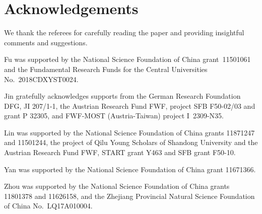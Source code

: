 \documentclass[12pt]{amsart}
\theoremstyle{plain}
\theoremstyle{definition}
\theoremstyle{example}
\theoremstyle{remark}
\numberwithin{equation}{section}
\numberwithin{figure}{section}
\begin{document}
\section*{Acknowledgements}

We thank the referees for carefully reading the paper and providing insightful comments and suggestions. 


Fu was supported by the National Science Foundation of China  grant~11501061 and the Fundamental Research Funds for the Central Universities No.~2018CDXYST0024.


Jin gratefully acknowledges supports from the German Research Foundation DFG, JI 207/1-1, the Austrian Research Fund FWF, project SFB F50-02/03 and grant P 32305, and FWF-MOST (Austria-Taiwan) project I~2309-N35.


Lin was supported by the National Science Foundation of China grants 11871247 and 11501244,   the project of Qilu Young Scholars of Shandong University and the Austrian Research Fund FWF, START grant Y463 and SFB grant F50-10. 


Yan was supported by the National Science Foundation of China  grant 11671366. 


Zhou was supported by the National Science Foundation of China  grants 11801378 and 11626158, and the Zhejiang Provincial Natural Science Foundation of China No.~LQ17A010004.
\end{document}
